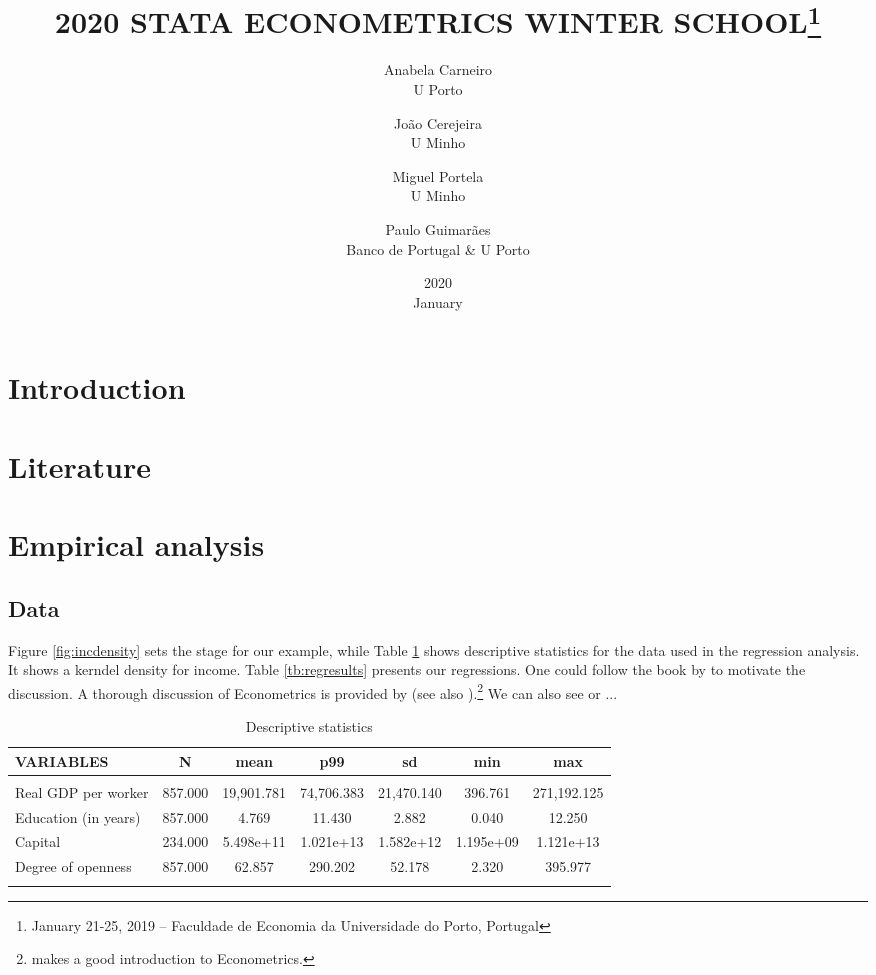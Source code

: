 \documentclass[12pt]{article}
\title{2020 STATA ECONOMETRICS WINTER SCHOOL\thanks{January 21-25, 2019 -- Faculdade de Economia da Universidade do Porto, Portugal}}
\date{2020\\ January}
\author{Anabela Carneiro\\ U Porto
\and João Cerejeira \\ U Minho
\and Miguel Portela \\ U Minho
\and Paulo Guimarães \\ Banco de Portugal \& U Porto}
\begin{document}
\maketitle

\section{Introduction}\label{sec:intro}

\lipsum

\section{Literature}

\lipsum

\section{Empirical analysis}

\subsection{Data}

\lipsum

Figure \ref{fig:incdensity} sets the stage for our example, while Table \ref{tb:descriptives} shows descriptive statistics for the data used in the regression analysis. It shows a kerndel density for income. Table \ref{tb:regresults} presents our regressions. One could follow the book by \cite{acemoglu2016} to motivate the discussion. A thorough discussion of Econometrics is provided by \cite{greene2017} (see also \citet{verbeek2012}).\footnote{\cite{wooldridge2015introductory} makes a good introduction to Econometrics.} We can also see \cite{harmon2003returns} or \cite{robeyns2003sen} ...

\begin{table}[h]\caption{Descriptive statistics}\label{tb:descriptives}
\begin{center}
\resizebox{0.9\textwidth}{!}
	{\begin{tabular}{lcccccc} \hline
VARIABLES & N & mean & p99 & sd & min & max \\ \hline
 &  &  &  &  &  &  \\
Real GDP per worker & 857.000 & 19,901.781 & 74,706.383 & 21,470.140 & 396.761 & 271,192.125 \\
Education (in years) & 857.000 & 4.769 & 11.430 & 2.882 & 0.040 & 12.250 \\
Capital & 234.000 & 5.498e+11 & 1.021e+13 & 1.582e+12 & 1.195e+09 & 1.121e+13 \\
Degree of openness & 857.000 & 62.857 & 290.202 & 52.178 & 2.320 & 395.977 \\
 &  &  &  &  &  &  \\ \hline
\end{tabular}}
\end{center}
\end{table}
\end{document}
